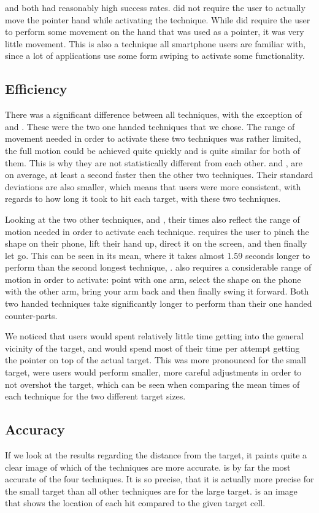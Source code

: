 \swipe and \throw both had reasonably high success rates. \throw did not require the user to actually move the pointer hand while activating the technique. While \swipe did require the user to perform some movement on the hand that was used as a pointer, it was very little movement. 
This is also a technique all smartphone users are familiar with, since a lot of applications use some form swiping to activate some functionality.

\subsection{Efficiency}
There was a significant difference between all techniques, with the exception of \swipe and \tilt. These were the two one handed techniques that we chose. The range of movement needed in order to activate these two techniques was rather limited, the full motion could be achieved quite quickly and is quite similar for both of them. 
This is why they are not statistically different from each other. \swipe and \tilt, are on average, at least a second faster then the other two techniques.
Their standard deviations are also smaller, which means that users were more consistent, with regards to how long it took to hit each target, with these two techniques. 

Looking at the two other techniques, \pinch and \throw, their times also reflect the range of motion needed in order to activate each technique. \pinch requires the user to pinch the shape on their phone, lift their hand up, direct it on the screen, and then finally let go. This can be seen in its mean, where it takes almost 1.59 seconds longer to perform than the second longest technique, \throw. \throw also requires a considerable range of motion in order to activate: point with one arm, select the shape on the phone with the other arm, bring your arm back and then finally swing it forward. Both two handed techniques take significantly longer to perform than their one handed counter-parts.

We noticed that users would spent relatively little time getting into the general vicinity of the target, and would spend most of their time per attempt getting the pointer on top of the actual target. 
This was more pronounced for the small target, were users would perform smaller, more careful adjustments in order to not overshot the target, which can be seen when comparing the mean times of each technique for the two different target sizes.

\subsection{Accuracy}
If we look at the results regarding the distance from the target, it paints quite a clear image of which of the techniques are more accurate. 
\swipe is by far the most accurate of the four techniques.
It is so precise, that it is actually more precise for the small target than all other techniques are for the large target. 
 is an image that shows the location of each hit compared to the given target cell. 

